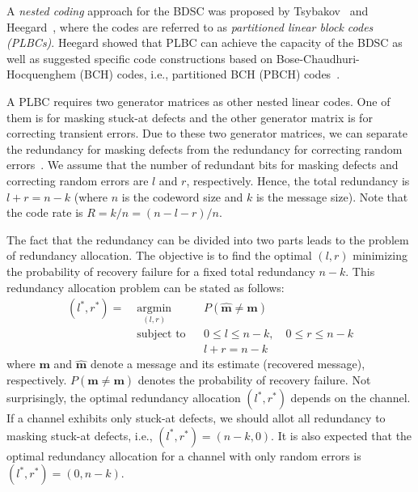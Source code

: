 \documentclass[10pt,twocolumn,twoside,submit]{JCNtran}
\begin{document}


	A \emph{nested coding} approach for the BDSC was proposed by Tsybakov~\cite{Tsybakov1975} and Heegard~\cite{Heegard1983plbc}, where the codes are referred to as \emph{partitioned linear block codes (PLBCs)}. Heegard showed that PLBC can achieve the capacity of the BDSC as well as suggested specific code constructions based on Bose-Chaudhuri-Hocquenghem (BCH) codes, i.e., partitioned BCH (PBCH) codes~\cite{Heegard1983plbc,Zamir2002nested}.
	
	A PLBC requires two generator matrices as other nested linear codes. One of them is for masking stuck-at defects and the other generator matrix is for correcting transient errors. Due to these two generator matrices, we can separate the redundancy for masking defects from the redundancy for correcting random errors~\cite{Heegard1983plbc}. We assume that the number of redundant bits for masking defects and correcting random errors are $l$ and $r$, respectively. Hence, the total redundancy is $l + r = n - k$ (where $n$ is the codeword size and $k$ is the message size). Note that the code rate is $R = k / n = (n - l - r) / n $.
	
	The fact that the redundancy can be divided into two parts leads to the problem of redundancy allocation. The objective is to find the optimal $(l, r)$ minimizing the probability of recovery failure for a fixed total redundancy $n-k$. This redundancy allocation problem can be stated as follows:
	\begin{equation}\label{eq:opt_prob}
		\begin{aligned}
		\left( l^*, r^* \right)  = \; & \underset{(l, r)}{\text{argmin}} & & P( \widehat{\mathbf{m}} \ne \mathbf{m})  \\
		& \text{subject to} & & 0 \le l \le n - k, \quad 0 \le r \le n - k\\
		&&&  l+r = n-k 
		\end{aligned}
	\end{equation}	
	where $\mathbf{m}$ and $\widehat{\mathbf{m}}$ denote a message and its estimate (recovered message), respectively. $P( \widehat{\mathbf{m}} \ne \mathbf{m})$ denotes the probability of recovery failure. Not surprisingly, the optimal redundancy allocation $(l^*, r^*)$ depends on the channel. If a channel exhibits only stuck-at defects, we should allot all redundancy to masking stuck-at defects, i.e., $(l^{*}, r^{*})=(n-k, 0)$. It is also expected that the optimal redundancy allocation for a channel with only random errors is $(l^{*}, r^{*})=(0, n-k)$.
		
\end{document}
